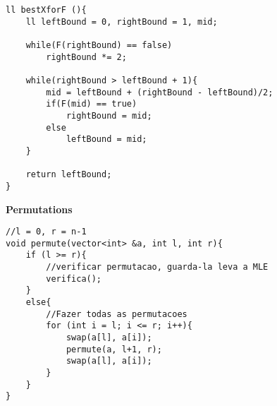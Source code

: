 \documentclass{article}
\begin{document}
\begin{multicols}{2}
\begin{lstlisting}
ll bestXforF (){
    ll leftBound = 0, rightBound = 1, mid;
    
    while(F(rightBound) == false)
        rightBound *= 2;

    while(rightBound > leftBound + 1){
        mid = leftBound + (rightBound - leftBound)/2;
        if(F(mid) == true)
            rightBound = mid;
        else    
            leftBound = mid;
    }

    return leftBound;
}
\end{lstlisting}

\large
\huge\textbf{Permutations}
\large
\begin{lstlisting}
//l = 0, r = n-1
void permute(vector<int> &a, int l, int r){
	if (l >= r){
		//verificar permutacao, guarda-la leva a MLE
		verifica();
	}
	else{
		//Fazer todas as permutacoes
		for (int i = l; i <= r; i++){
			swap(a[l], a[i]);
			permute(a, l+1, r);
			swap(a[l], a[i]);
		}
	}
}
\end{lstlisting}

\end{multicols}
\end{document}
